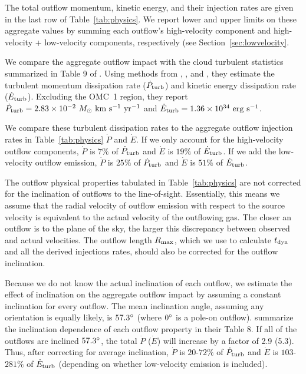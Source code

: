 \documentclass[twocolumn]{aastex63}
\begin{document}
The total outflow momentum, kinetic energy, and their injection rates are given in the last row of Table~\ref{tab:physics}. We report lower and upper limits on these aggregate values by summing each outflow's high-velocity component and high-velocity + low-velocity components, respectively (see Section~\ref{sec:lowvelocity}. 

We compare the aggregate outflow impact with the cloud turbulent statistics summarized in Table 9 of \citet{Tanabe:submitted}. Using methods from \citet{Mac-Low99}, \citet{McKee07}, and \citet{Li15}, they estimate the turbulent momentum dissipation rate ($\dot P_{\rm turb}$) and kinetic energy dissipation rate ($\dot E_{\rm turb}$). Excluding the OMC~1 region, they report $\dot P_{\rm turb}= 2.83\times10^{-2}~M_\odot~\rm{km}~\rm{s}^{-1}~\rm{yr}^{-1}$ and $\dot E_{\rm turb}=1.36\times10^{34}~\rm{erg}~\rm{s}^{-1}$.

We compare these turbulent dissipation rates to the aggregate outflow injection rates in Table~\ref{tab:physics} $\dot P$ and $\dot E$. If we only account for the high-velocity outflow components, $\dot P$ is $7\%$ of $\dot P_{\rm turb}$ and $\dot E$ is $19\%$ of $\dot E_{\rm turb}$. If we add the low-velocity outflow emission, $\dot P$ is $25\%$ of $\dot P_{\rm turb}$ and $\dot E$ is $51\%$ of $\dot E_{\rm turb}$.

The outflow physical properties tabulated in Table~\ref{tab:physics} are not corrected for the inclination of outflows to the line-of-sight. Essentially, this means we assume that the radial velocity of outflow emission with respect to the source velocity is equivalent to the actual velocity of the outflowing gas. The closer an outflow is to the plane of the sky, the larger this discrepancy between observed and actual velocities. The outflow length $R_{\rm max}$, which we use to calculate $t_{\rm dyn}$ and all the derived injections rates, should also be corrected for the outflow inclination.

Because we do not know the actual inclination of each outflow, we estimate the effect of inclination on the aggregate outflow impact by assuming a constant inclination for every outflow. The mean inclination angle, assuming any orientation is equally likely, is $57.3\mbox{$^\circ$}$ (where $0\mbox{$^\circ$}$ is a pole-on outflow). 
\citet{Dunham14} summarize the inclination dependence of each outflow property in their Table 8. If all of the outflows are inclined $57.3\mbox{$^\circ$}$, the total $\dot P$ ($\dot E$) will increase by a factor of 2.9 (5.3). Thus, after correcting for average inclination, $\dot P$ is  $20$-$72\%$ of $\dot P_{\rm turb}$ and $\dot E$ is $103$-$281\%$ of $\dot E_{\rm turb}$ (depending on whether low-velocity emission is included).
\end{document}
